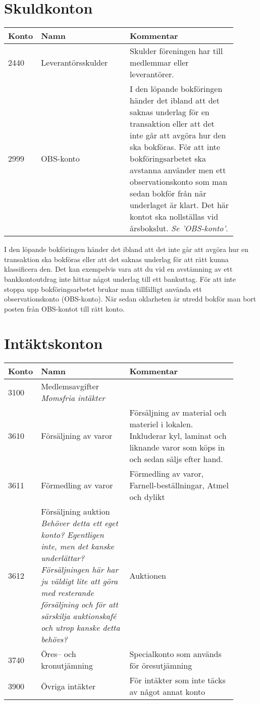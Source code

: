 \section{Skuldkonton}
\begin{minipage}{\fullwidthlength}
	\begin{longtable}[l]{l p{0.4\linewidth} p{0.5\linewidth}}
		Konto	&	Namn								& Kommentar \\ \toprule \endhead
		2440	&	Leverantörsskulder					& Skulder föreningen har till medlemmar eller leverantörer. \\
		2999	&	OBS-konto							& I den löpande bokföringen händer det ibland att det saknas underlag för en transaktion eller att det inte går att avgöra hur den ska bokföras. För att inte bokföringsarbetet ska avstanna använder men ett observationskonto som man sedan bokför från när underlaget är klart. Det här kontot ska nollställas vid årsbokslut. \emph{Se 'OBS-konto'}.
	\end{longtable}
\end{minipage}

I den löpande bokföringen händer det ibland att det inte går att avgöra hur en transaktion ska bokföras eller att det saknas underlag för att rätt kunna klassificera den. Det kan exempelvis vara att du vid en avstämning av ett bankkontoutdrag inte hittar något underlag till ett bankuttag. För att inte stoppa upp bokföringsarbetet brukar man tillfälligt använda ett observationskonto (OBS-konto). När sedan oklarheten är utredd bokför man bort posten från OBS-kontot till rätt konto.



\section{Intäktskonton}
\begin{minipage}{\fullwidthlength}
	\begin{longtable}[l]{l p{0.4\linewidth} p{0.5\linewidth}}
		Konto	&	Namn								& Kommentar \\ \toprule \endhead
		3100	&	Medlemsavgifter \newline \emph{Momsfria intäkter} \\
		3610	&	Försäljning av varor				& Försäljning av material och materiel i lokalen. Inkluderar kyl, laminat och liknande varor som köps in och sedan säljs efter hand.\\
		3611	&	Förmedling av varor					& Förmedling av varor, Farnell-beställningar, Atmel och dylikt\\
		3612	&	Försäljning auktion \emph{Behöver detta ett eget konto? Egentligen inte, men det kanske underlättar? Försäljningen här har ju väldigt lite att göra med resterande försäljning och för att särskilja auktionskafé och utrop kanske detta behövs?} & Auktionen\\
		3740	&	Öres-- och kronutjämning			& Specialkonto som används för öresutjämning\\
		3900	&	Övriga intäkter						& För intäkter som inte täcks av något annat konto
	\end{longtable}
\end{minipage}

